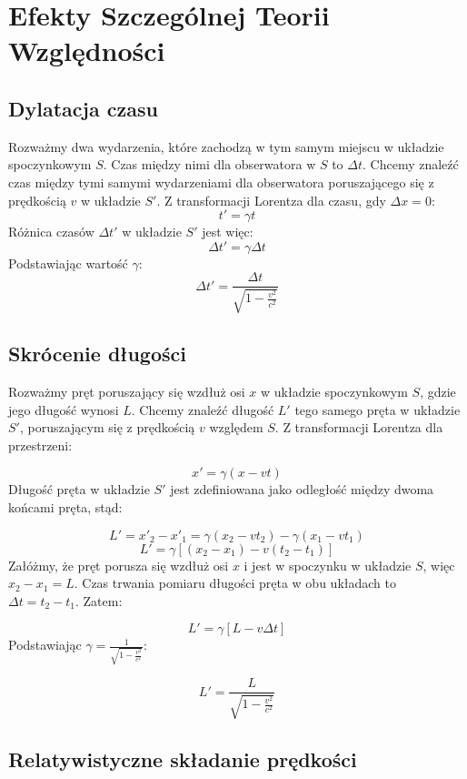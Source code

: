 \documentclass{article}
\theoremstyle{definition}
\theoremstyle{definition}
\theoremstyle{definition}
\theoremstyle{definition}
\begin{document}
\section{Efekty Szczególnej Teorii Względności}
\subsection{Dylatacja czasu}

Rozważmy dwa wydarzenia, które zachodzą w tym samym miejscu w układzie spoczynkowym \( S \). Czas między nimi dla obserwatora w \( S \) to \( \Delta t \). Chcemy znaleźć czas między tymi samymi wydarzeniami dla obserwatora poruszającego się z prędkością \( v \) w układzie \( S' \).
Z transformacji Lorentza dla czasu, gdy \( \Delta x = 0 \):
\[ t' = \gamma t \]
Różnica czasów \( \Delta t' \) w układzie \( S' \) jest więc:
\[ \Delta t' = \gamma \Delta t \]
Podstawiając wartość \( \gamma \):
\[ \Delta t' = \frac{\Delta t}{\sqrt{1 - \frac{v^2}{c^2}}} \]

\subsection{Skrócenie długości}

Rozważmy pręt poruszający się wzdłuż osi \( x \) w układzie spoczynkowym \( S \), gdzie jego długość wynosi \( L \). Chcemy znaleźć długość \( L' \) tego samego pręta w układzie \( S' \), poruszającym się z prędkością \( v \) względem \( S \).
Z transformacji Lorentza dla przestrzeni:

\[ x' = \gamma (x - vt) \]
Długość pręta w układzie \( S' \) jest zdefiniowana jako odległość między dwoma końcami pręta, stąd:

\[ L' = x'_2 - x'_1 = \gamma (x_2 - vt_2) - \gamma (x_1 - vt_1) \]
\[ L' = \gamma [(x_2 - x_1) - v(t_2 - t_1)] \]
Załóżmy, że pręt porusza się wzdłuż osi \( x \) i jest w spoczynku w układzie \( S \), więc \( x_2 - x_1 = L \). Czas trwania pomiaru długości pręta w obu układach to \( \Delta t = t_2 - t_1 \).
Zatem:

\[ L' = \gamma [L - v \Delta t] \]
Podstawiając \( \gamma = \frac{1}{\sqrt{1 - \frac{v^2}{c^2}}} \):

\[ L' = \frac{L}{\sqrt{1 - \frac{v^2}{c^2}}} \]

\subsection{Relatywistyczne składanie prędkości}
\end{document}
